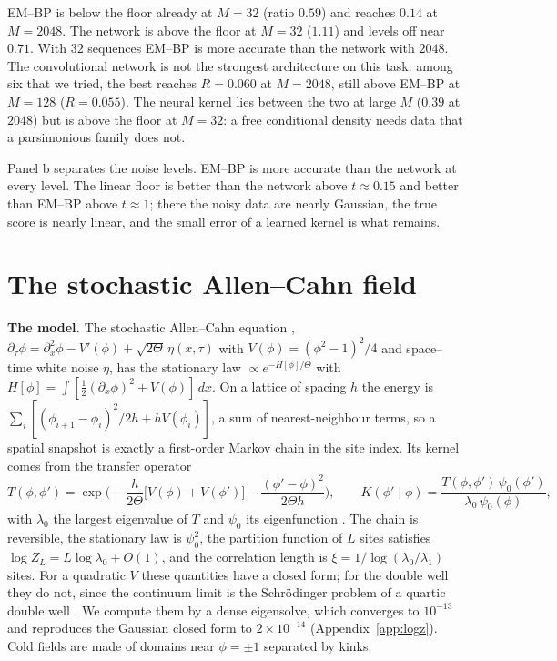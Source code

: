 \documentclass[11pt,a4paper]{article}
\begin{document}
EM--BP is below the floor already at $M=32$ (ratio $0.59$) and reaches $0.14$ at $M=2048$. The network is above the floor at
$M=32$ ($1.11$) and levels off near $0.71$. With $32$ sequences EM--BP is more accurate than the network with $2048$. The
convolutional network is not the strongest architecture on this task: among six that we tried, the best reaches $R=0.060$ at
$M=2048$, still above EM--BP at $M=128$ ($R=0.055$). The neural kernel lies between the two at large $M$ ($0.39$ at $2048$)
but is above the floor at $M=32$: a free conditional density needs data that a parsimonious family does not.

Panel b separates the noise levels. EM--BP is more accurate than the network at every level. The linear floor is better than
the network above $t\approx0.15$ and better than EM--BP above $t\approx1$; there the noisy data are nearly Gaussian, the true
score is nearly linear, and the small error of a learned kernel is what remains.

\section{The stochastic Allen--Cahn field}
\label{sec:field}

\textbf{The model.} The stochastic Allen--Cahn equation \citep{allen1979microscopic},
$\partial_\tau\phi=\partial_x^2\phi-V'(\phi)+\sqrt{2\Theta}\,\eta(x,\tau)$ with $V(\phi)=(\phi^2-1)^2/4$ and space--time white
noise $\eta$, has the stationary law $\propto e^{-H[\phi]/\Theta}$ with $H[\phi]=\int[\tfrac12(\partial_x\phi)^2+V(\phi)]\,dx$. On a
lattice of spacing $h$ the energy is $\sum_i[(\phi_{i+1}-\phi_i)^2/2h+hV(\phi_i)]$, a sum of nearest-neighbour terms, so a
spatial snapshot is exactly a first-order Markov chain in the site index. Its kernel comes from the transfer operator
\[
T(\phi,\phi')=\exp\Big(-\frac{h}{2\Theta}\big[V(\phi)+V(\phi')\big]-\frac{(\phi'-\phi)^2}{2\Theta h}\Big),\qquad
K(\phi'\mid\phi)=\frac{T(\phi,\phi')\,\psi_0(\phi')}{\lambda_0\,\psi_0(\phi)},
\]
with $\lambda_0$ the largest eigenvalue of $T$ and $\psi_0$ its eigenfunction \citep{scalapino1972statistical}. The chain is
reversible, the stationary law is $\psi_0^2$, the partition function of $L$ sites satisfies $\log Z_L=L\log\lambda_0+O(1)$, and the
correlation length is
$\xi=1/\log(\lambda_0/\lambda_1)$ sites. For a quadratic $V$ these quantities have a closed form; for the double well they do
not, since the continuum limit is the Schr\"odinger problem of a quartic double well
\citep{krumhansl1975dynamics,khare1997exact}. We compute them by a dense eigensolve, which converges to $10^{-13}$ and reproduces
the Gaussian closed form to $2\times10^{-14}$ (Appendix~\ref{app:logz}). Cold fields are made of domains near $\phi=\pm1$
separated by kinks.
\end{document}
